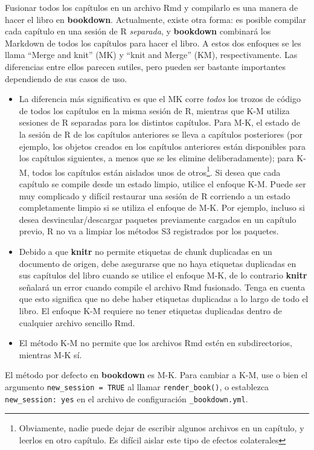 \documentclass[12pt,]{krantz}
\providecommand{\tightlist}{%
  \setlength{\itemsep}{0pt}\setlength{\parskip}{0pt}}
\theoremstyle{definition}
\theoremstyle{definition}
\theoremstyle{remark}
\begin{document}
Fusionar todos los capítulos en un archivo Rmd y compilarlo es una
manera de hacer el libro en \textbf{bookdown}. Actualmente, existe otra
forma: es posible compilar cada capítulo en una sesión de R
\emph{separada}, y \textbf{bookdown} combinará los Markdown de todos los
capítulos para hacer el libro. A estos dos enfoques se les llama ``Merge
and knit'' (MK) y ``knit and Merge'' (KM), respectivamente. Las
diferencias entre ellos parecen sutiles, pero pueden ser bastante
importantes dependiendo de sus casos de uso.

\begin{itemize}
\tightlist
\item
  La diferencia más significativa es que el MK corre \emph{todos} los
  trozos de código de todos los capítulos en la misma sesión de R,
  mientras que K-M utiliza sesiones de R separadas para los distintos
  capítulos. Para M-K, el estado de la sesión de R de los capítulos
  anteriores se lleva a capítulos posteriores (por ejemplo, los objetos
  creados en los capítulos anteriores están disponibles para los
  capítulos siguientes, a menos que se les elimine deliberadamente);
  para K-M, todos los capítulos están aislados unos de otros\footnote{Obviamente,
    nadie puede dejar de escribir algunos archivos en un capítulo, y
    leerlos en otro capítulo. Es difícil aislar este tipo de efectos
    colaterales}. Si desea que cada capítulo se compile desde un estado
  limpio, utilice el enfoque K-M. Puede ser muy complicado y difícil
  restaurar una sesión de R corriendo a un estado completamente limpio
  si se utiliza el enfoque de M-K. Por ejemplo, incluso si desea
  desvincular/descargar paquetes previamente cargados en un capítulo
  previo, R no va a limpiar los métodos S3 registrados por los paquetes.
\item
  Debido a que \textbf{knitr} no permite etiquetas de chunk duplicadas
  en un documento de origen, debe asegurarse que no haya etiquetas
  duplicadas en sus capítulos del libro cuando se utilice el enfoque
  M-K, de lo contrario \textbf{knitr} señalará un error cuando compile
  el archivo Rmd fusionado. Tenga en cuenta que esto significa que no
  debe haber etiquetas duplicadas a lo largo de todo el libro. El
  enfoque K-M requiere no tener etiquetas duplicadas dentro de cualquier
  archivo sencillo Rmd.
\item
  El método K-M no permite que los archivos Rmd estén en subdirectorios,
  mientras M-K sí.
\end{itemize}

El método por defecto en \textbf{bookdown} es M-K. Para cambiar a K-M,
use o bien el argumento \texttt{new\_session\ =\ TRUE} al llamar
\texttt{render\_book()}, o establezca \texttt{new\_session:\ yes} en el
archivo de configuración \texttt{\_bookdown.yml}.
\end{document}
